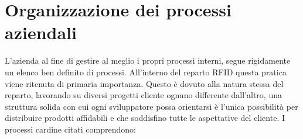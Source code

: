 
\section{Organizzazione dei processi aziendali}

L'azienda al fine di gestire al meglio i propri processi interni, segue rigidamente un elenco ben definito di processi. All'interno del reparto RFID questa
pratica viene ritenuta di primaria importanza. Questo è dovuto alla natura stessa del reparto, lavorando su diversi progetti cliente ognuno differente 
dall'altro, una struttura solida con cui ogni sviluppatore possa orientarsi è l'unica possibilità per distribuire prodotti affidabili e che soddisfino
tutte le aspettative del cliente. I processi cardine citati comprendono:
